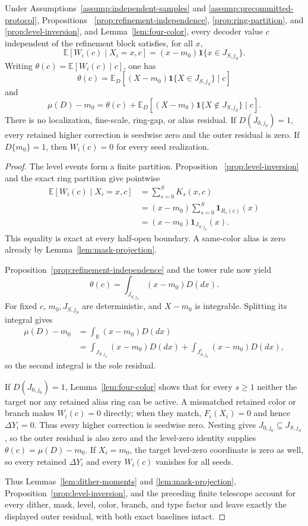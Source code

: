 \begin{proposition}
\label{prop:mean-telescope}
Under Assumptions~\ref{assump:independent-samples} and
\ref{assump:precommitted-protocol}, Propositions~
\ref{prop:refinement-independence}, \ref{prop:ring-partition}, and
\ref{prop:level-inversion}, and Lemma~\ref{lem:four-color}, every decoder
value $c$ independent of the refinement block satisfies, for all $x$,
\[
 \mathbb E[W_i(c)\mid X_i=x,c]
 =(x-m_0)\mathbf1\{x\in J_{S,j_S}\}.
\]
Writing $\theta(c)=\mathbb E[W_i(c)\mid c]$, one has
\[
 \theta(c)=\mathbb E_D[(X-m_0)\mathbf1\{X\in J_{S,j_S}\}\mid c]
\]
and
\[
 \mu(D)-m_0=\theta(c)+
 \mathbb E_D[(X-m_0)\mathbf1\{X\notin J_{S,j_S}\}\mid c].
\]
There is no localization, fine-scale, ring-gap, or alias residual.  If
$D(J_{0,j_0})=1$, every retained higher correction is seedwise zero and the
outer residual is zero.  If $D\{m_0\}=1$, then $W_i(c)=0$ for every seed
realization.
\end{proposition}

\begin{proof}
The level events form a finite partition.  Proposition~
\ref{prop:level-inversion} and the exact ring partition give pointwise
\[
\begin{aligned}
 \mathbb E[W_i(c)\mid X_i=x,c]
 &=\sum_{s=0}^S K_s(x,c)\\
 &=(x-m_0)\sum_{s=0}^S\mathbf1_{R_s(c)}(x)\\
 &=(x-m_0)\mathbf1_{J_{S,j_S}}(x).
\end{aligned}
\]
This equality is exact at every half-open boundary.  A same-color alias is
zero already by Lemma~\ref{lem:mask-projection}.

Proposition~\ref{prop:refinement-independence} and the tower rule now yield
\[
 \theta(c)=\int_{J_{S,j_S}}(x-m_0)D(dx).
\]
For fixed $c$, $m_0,J_{S,j_S}$ are deterministic, and $X-m_0$ is integrable.
Splitting its integral gives
\[
\begin{aligned}
 \mu(D)-m_0
 &=\int_{\mathbb R}(x-m_0)D(dx)\\
 &=\int_{J_{S,j_S}}(x-m_0)D(dx)
  +\int_{J_{S,j_S}^c}(x-m_0)D(dx),
\end{aligned}
\]
so the second integral is the sole residual.

If $D(J_{0,j_0})=1$, Lemma~\ref{lem:four-color} shows that for every
$s\geq1$ neither the target nor any retained alias ring can be active.  A
mismatched retained color or branch makes $W_i(c)=0$ directly; when they
match, $F_i(X_i)=0$ and hence $\Delta Y_i=0$.  Thus every higher correction
is seedwise zero.  Nesting gives $J_{0,j_0}\subseteq J_{S,j_S}$, so the
outer residual is also zero and the level-zero identity supplies
$\theta(c)=\mu(D)-m_0$.  If $X_i=m_0$, the target level-zero coordinate is
zero as well, so every retained $\Delta Y_i$ and every $W_i(c)$ vanishes for
all seeds.

Thus Lemmas~\ref{lem:dither-moments} and \ref{lem:mask-projection},
Proposition~\ref{prop:level-inversion}, and the preceding finite telescope
account for every dither, mask, level, color, branch, and type factor and
leave exactly the displayed outer residual, with both exact baselines intact.
\end{proof}

